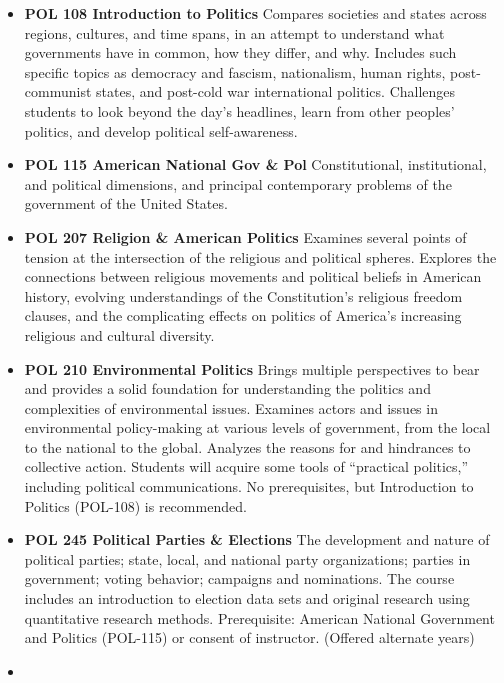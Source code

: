 \documentclass[
  letterpaper,
]{scrbook}
\providecommand{\tightlist}{%
  \setlength{\itemsep}{0pt}\setlength{\parskip}{0pt}}
\begin{document}
\begin{itemize}
\tightlist
\item
  \textbf{POL 108 Introduction to Politics} Compares societies and
  states across regions, cultures, and time spans, in an attempt to
  understand what governments have in common, how they differ, and why.
  Includes such specific topics as democracy and fascism, nationalism,
  human rights, post-communist states, and post-cold war international
  politics. Challenges students to look beyond the day's headlines,
  learn from other peoples' politics, and develop political
  self-awareness.\\
\item
  \textbf{POL 115 American National Gov \& Pol} Constitutional,
  institutional, and political dimensions, and principal contemporary
  problems of the government of the United States.
\item
  \textbf{POL 207 Religion \& American Politics} Examines several points
  of tension at the intersection of the religious and political spheres.
  Explores the connections between religious movements and political
  beliefs in American history, evolving understandings of the
  Constitution's religious freedom clauses, and the complicating effects
  on politics of America's increasing religious and cultural
  diversity.\\
\item
  \textbf{POL 210 Environmental Politics} Brings multiple perspectives
  to bear and provides a solid foundation for understanding the politics
  and complexities of environmental issues. Examines actors and issues
  in environmental policy-making at various levels of government, from
  the local to the national to the global. Analyzes the reasons for and
  hindrances to collective action. Students will acquire some tools of
  ``practical politics,'' including political communications. No
  prerequisites, but Introduction to Politics (POL-108) is recommended.
\item
  \textbf{POL 245 Political Parties \& Elections} The development and
  nature of political parties; state, local, and national party
  organizations; parties in government; voting behavior; campaigns and
  nominations. The course includes an introduction to election data sets
  and original research using quantitative research methods.
  Prerequisite: American National Government and Politics (POL-115) or
  consent of instructor. (Offered alternate years)\\
\item

\end{itemize}
\end{document}
